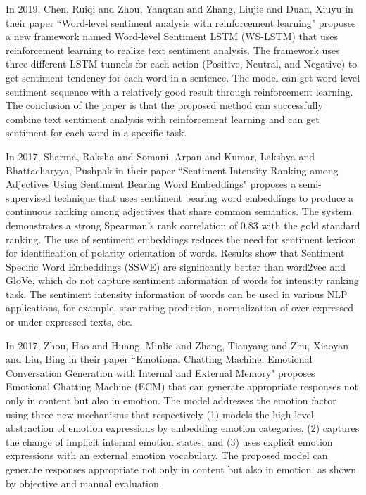In 2019, Chen, Ruiqi and Zhou, Yanquan and Zhang, Liujie and Duan, Xiuyu in their paper ``Word-level sentiment analysis with reinforcement learning" proposes a new framework named Word-level Sentiment LSTM (WS-LSTM) that uses reinforcement learning to realize text sentiment analysis. The framework uses three different LSTM tunnels for each action (Positive, Neutral, and Negative) to get sentiment tendency for each word in a sentence. The model can get word-level sentiment sequence with a relatively good result through reinforcement learning. The conclusion of the paper is that the proposed method can successfully combine text sentiment analysis with reinforcement learning and can get sentiment for each word in a specific task\cite{article5}.
\vspace{1\baselineskip}

In 2017, Sharma, Raksha and Somani, Arpan and Kumar, Lakshya and Bhattacharyya, Pushpak in their paper ``Sentiment Intensity Ranking among Adjectives Using Sentiment Bearing Word Embeddings" proposes a semi-supervised technique that uses sentiment bearing word embeddings to produce a continuous ranking among adjectives that share common semantics. The system demonstrates a strong Spearman's rank correlation of 0.83 with the gold standard ranking. The use of sentiment embeddings reduces the need for sentiment lexicon for identification of polarity orientation of words. Results show that Sentiment Specific Word Embeddings (SSWE) are significantly better than word2vec and GloVe, which do not capture sentiment information of words for intensity ranking task. The sentiment intensity information of words can be used in various NLP applications, for example, star-rating prediction, normalization of over-expressed or under-expressed texts, etc\cite{article7}.
\vspace{1\baselineskip}

In 2017, Zhou, Hao and Huang, Minlie and Zhang, Tianyang and Zhu, Xiaoyan and Liu, Bing in their paper ``Emotional Chatting Machine: Emotional Conversation Generation with Internal and External Memory" proposes Emotional Chatting Machine (ECM) that can generate appropriate responses not only in content but also in emotion. The model addresses the emotion factor using three new mechanisms that respectively (1) models the high-level abstraction of emotion expressions by embedding emotion categories, (2) captures the change of implicit internal emotion states, and (3) uses explicit emotion expressions with an external emotion vocabulary. The proposed model can generate responses appropriate not only in content but also in emotion, as shown by objective and manual evaluation\cite{article6}.
\vspace{1\baselineskip}

